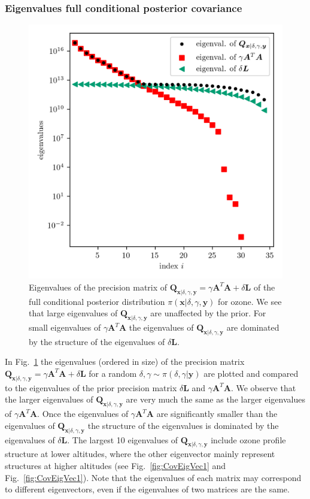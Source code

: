\subsubsection{Eigenvalues full conditional posterior covariance}
\begin{figure}[ht!]
	\centering
	\includegraphics{CovSing.png}
	\caption[Eigenvalues of the posterior precision matrix]{Eigenvalues of the precision matrix of $\bm{Q}_{ \bm{x}|\delta, \gamma, \bm{y}}= \gamma \bm{A}^T \bm{A} + \delta \bm{L}$ of the full conditional posterior distribution $\pi(\bm{x}|\delta, \gamma, \bm{y})$ for ozone.
		We see that large eigenvalues of $\bm{Q}_{ \bm{x}|\delta, \gamma, \bm{y}} $ are unaffected by the prior.
		For small eigenvalues of $\gamma \bm{A}^T \bm{A}$ the eigenvalues of $\bm{Q}_{ \bm{x}|\delta, \gamma, \bm{y}} $ are dominated by the structure of the eigenvalues of $ \delta \bm{L}$.}
	\label{fig:PostCov}
\end{figure}
In Fig.~\ref{fig:PostCov} the eigenvalues (ordered in size) of the precision matrix $\bm{Q}_{ \bm{x}|\delta, \gamma,\bm{y}}=  \gamma \bm{A}^T \bm{A} + \delta \bm{L} $ for a random $\delta,\gamma \sim \pi(\delta,\gamma|\bm{y})$ are plotted and compared to the eigenvalues of the prior precision matrix $\delta \bm{L}$ and $\gamma \bm{A}^T \bm{A}$.
We observe that the larger eigenvalues of $\bm{Q}_{ \bm{x}|\delta, \gamma,\bm{y}}$ are very much the same as the larger eigenvalues of $\gamma \bm{A}^T \bm{A}$.
Once the eigenvalues of $\gamma \bm{A}^T \bm{A}$ are significantly smaller than the eigenvalues of $\bm{Q}_{ \bm{x}|\delta, \gamma,\bm{y}}$ the structure of the eigenvalues is dominated by the eigenvalues of $\delta \bm{L}$.
The largest 10 eigenvalues of $\bm{Q}_{ \bm{x}|\delta, \gamma,\bm{y}}$ include ozone profile structure at lower altitudes, where the other eigenvector mainly represent structures at higher altitudes (see Fig.~\ref{fig:CovEigVec1} and Fig.~\ref{fig:CovEigVec1}).
Note that the eigenvalues of each matrix may correspond to different eigenvectors, even if the eigenvalues of two matrices are the same.

